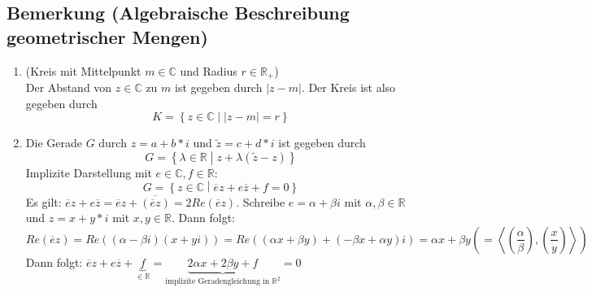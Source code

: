 \subsection{Bemerkung (Algebraische Beschreibung geometrischer Mengen)}
\begin{enumerate}
\item (Kreis mit Mittelpunkt $m \in \mathbb{C}$ und Radius $r \in \mathbb{R}_+$)\\
	Der Abstand von $z \in \mathbb{C}$ zu $m$ ist gegeben durch $|z - m|$.
	Der Kreis ist also gegeben durch
	\[K = \left\{ z \in \mathbb{C} \middle| |z - m| = r \right\} \]
\item Die Gerade $G$ durch $z = a + b * i$ und $\tilde{z} = c + d * i$ ist gegeben durch
	\[G = \left\{ \lambda \in \mathbb{R} \middle| z + \lambda (\tilde{z} - z) \right\} \]
	Implizite Darstellung  mit $e \in \mathbb{C}, f \in \mathbb{R}$:
	\[G = \left\{ z \in \mathbb{C} \middle| \overline{e} z + e \overline{z} + f = 0 \right\} \]
	Es gilt: $\overline{e} z + e \overline{z} = \overline{e} z + \overline{(\overline{e} z)} = 2 Re (\overline{e} z)$.
	Schreibe $e = \alpha + \beta i$ mit $\alpha, \beta \in \mathbb{R}$ und $z = x + y * i$ mit $x, y \in \mathbb{R}$.
	Dann folgt:
	\[Re(\overline{e} z) = Re ((\alpha - \beta i)(x + y i))
	= Re ((\alpha x + \beta y) + (-\beta x + \alpha y)i)
	= \alpha x + \beta y
	\left( = \left< \left( \frac{\alpha}{\beta}  \right), \left( \frac{x}{y} \right) \right> \right) \]
	Dann folgt: $\overline{e} z + e \overline {z} + \underbrace{f}_{\in \mathbb{R}} = \underbrace{2 \alpha x + 2 \beta y + f} _{\text{implizite Geradengleichung in }\mathbb{R}^2} = 0$
\end{enumerate}

